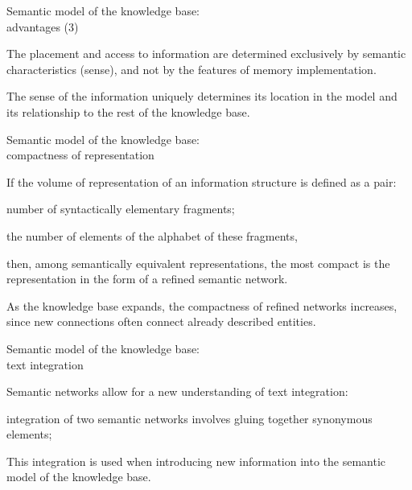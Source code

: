 \begin{frame}{Semantic model of the knowledge base:\\advantages (3)}
	\topline
	\justifying
	
	\begin{textitemize}
		\item The placement and access to information are determined exclusively by semantic characteristics (sense), and not by the features of memory implementation.
		\item The sense of the information uniquely determines its location in the model and its relationship to the rest of the knowledge base.
	\end{textitemize}
	
\end{frame}


\begin{frame}{Semantic model of the knowledge base:\\compactness of representation}
	\topline
	\justifying
	
	If the volume of representation of an information structure is defined as a pair:
	\begin{textitemize}
		\item number of syntactically elementary fragments;
		\item the number of elements of the alphabet of these fragments,
	\end{textitemize}
	then, among semantically equivalent representations, the most compact is the representation in the form of a refined semantic network.
	
	\medskip
	As the knowledge base expands, the compactness of refined networks increases, since new connections often connect already described entities.
	
\end{frame}


\begin{frame}{Semantic model of the knowledge base:\\text integration}
	\topline
	\justifying
	
	Semantic networks allow for a new understanding of text integration:
	\begin{textitemize}
		\item integration of two semantic networks involves gluing together synonymous elements;
		\item This integration is used when introducing new information into the semantic model of the knowledge base.
	\end{textitemize}
	
\end{frame}


